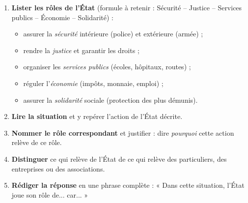 \documentclass[11pt]{article}
\newcommand{\cle}[1]{{\popxbold\color{popdark}#1}}
\begin{document}
\begin{methode}
\begin{enumerate}
\item \textbf{Lister les rôles de l'État} (formule à retenir : \cle{Sécurité -- Justice -- Services publics -- Économie -- Solidarité}) :
\begin{itemize}
\item assurer la \emph{sécurité} intérieure (police) et extérieure (armée) ;
\item rendre la \emph{justice} et garantir les droits ;
\item organiser les \emph{services publics} (écoles, hôpitaux, routes) ;
\item réguler l'\emph{économie} (impôts, monnaie, emploi) ;
\item assurer la \emph{solidarité} sociale (protection des plus démunis).
\end{itemize}
\item \textbf{Lire la situation} et y repérer l'action de l'État décrite.
\item \textbf{Nommer le rôle correspondant} et justifier : dire \emph{pourquoi} cette action relève de ce rôle.
\item \textbf{Distinguer} ce qui relève de l'État de ce qui relève des particuliers, des entreprises ou des associations.
\item \textbf{Rédiger la réponse} en une phrase complète : « Dans cette situation, l'État joue son rôle de... car... »
\end{enumerate}
\end{methode}
\end{document}
